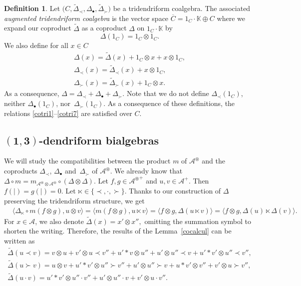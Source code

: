 \documentclass[10pt,a4paper]{amsart}
\numberwithin{equation}{section}
\theoremstyle{definition}
\newtheorem{defi}{Definition}[section]
\theoremstyle{plain}
\newcommand{\K}{\mathbb{K}}
\begin{document}
\begin{defi}
	Let $\bigl(C,\tilde{\Delta}_{\prec},\Delta_{\bullet},\tilde{\Delta}_{\succ}\bigr)$ be a tridendriform coalgebra.
	The associated \emph{augmented tridendriform coalgebra} is the vector space $\overline{C}=1_C\cdot\K\oplus C$ where we expand our coproduct $\tilde{\Delta}$ as a coproduct $\Delta$ on $1_C\cdot\K$ by
	\[
	\Delta(1_C)=1_C\otimes 1_C.
	\]
	We also define for all $x\in C$
	\begin{gather*}
		\Delta(x)=\tilde{\Delta}(x)+1_C\otimes x+x\otimes 1_C, \\
		\Delta_{\prec}(x)=\tilde{\Delta}_{\prec}(x)+x\otimes 1_C, \\
		\Delta_{\succ}(x)=\tilde{\Delta}_{\succ}(x)+1_C\otimes x.
	\end{gather*}	
As a consequence, $\Delta=\Delta_{\prec}+\Delta_{\bullet}+\Delta_{\succ}.$
Note that we do not define $\Delta_{\prec}(1_C)$, neither $\Delta_{\bullet}(1_C)$, nor~$\Delta_{\succ}(1_C)$. As a consequence of these definitions, the relations \eqref{cotri1}--\eqref{cotri7} are satisfied over $C$.
\end{defi}

\subsection[(1,3)-dendriform bialgebras]{$\boldsymbol{(1,3)}$-dendriform bialgebras}

We will study the compatibilities between the product $m$ of $\mathcal{A}^{\circledast}$ and the coproducts $\Delta_{\prec}$, $\Delta_{\bullet}$ and~$\Delta_{\succ}$ of $\mathcal{A}^{\circledast}$. We already know that $\Delta \circ m=m_{\mathcal{A}^{\circledast}\otimes \mathcal{A}^{\circledast}}\circ (\Delta \otimes \Delta)$. Let $f,g\in{\mathcal{A}^{\circledast}}^+$ and $u,v\in \mathcal{A}^+$. Then $f(|)=g(|)=0$. Let $\ltimes\in\{\prec,\cdot,\succ\}$.
Thanks to our construction of $\Delta$ preserving the tridendriform structure, we get
\begin{align*}
	& \langle \Delta_{\ltimes}\circ m(f\otimes g),u\otimes v \rangle= \langle m(f\otimes g), u\ltimes v \rangle
	= \langle f\otimes g,\Delta(u\ltimes v) \rangle
	= \langle f\otimes g,\Delta(u)\ltimes \Delta(v) \rangle.
\end{align*}
For $x\in \mathcal{A}$, we also denote $\tilde{\Delta}(x)=x'\otimes x'',$ omitting the summation symbol to shorten the writing.
Therefore, the results of the Lemma~\ref{cocalcul} can be written as
\begin{gather*}
\tilde{\Delta}(u\prec v)=v\otimes u+v'\otimes u\prec v''+u'*v\otimes u''+u'\otimes u''\prec v+u'*v'\otimes u''\prec v'', \\
\tilde{\Delta}(u\succ v)=u\otimes v+u'*v'\otimes u''\succ v'' +u'\otimes u''\succ v+u*v'\otimes v''+v'\otimes u\succ v'',\\
\tilde{\Delta}(u\cdot v)=u'*v'\otimes u''\cdot v'' +u'\otimes u''\cdot v + v'\otimes u\cdot v''.
\end{gather*}
\end{document}
